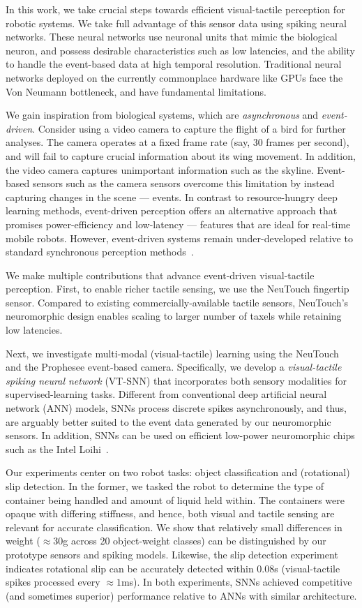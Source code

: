 \documentclass[fyp]{socreport}
\begin{document}
In this work, we take crucial steps towards efficient visual-tactile perception
for robotic systems. We take full advantage of this sensor data using spiking
neural networks. These neural networks use neuronal units that mimic the
biological neuron, and possess desirable characteristics such as low latencies,
and the ability to handle the event-based data at high temporal resolution.
Traditional neural networks deployed on the currently commonplace hardware like
GPUs face the Von Neumann bottleneck, and have fundamental limitations.

We gain inspiration from biological systems, which are \emph{asynchronous} and
\emph{event-driven}. Consider using a video camera to capture the flight of a
bird for further analyses. The camera operates at a fixed frame rate (say, 30
frames per second), and will fail to capture crucial information about its wing
movement. In addition, the video camera captures unimportant information such as
the skyline. Event-based sensors such as the camera sensors overcome this
limitation by instead capturing changes in the scene --- events. In contrast to
resource-hungry deep learning methods, event-driven perception offers an
alternative approach that promises power-efficiency and low-latency --- features
that are ideal for real-time mobile robots. However, event-driven systems remain
under-developed relative to standard synchronous perception
methods~\cite{pfeiffer2018deep}.

We make multiple contributions that advance event-driven visual-tactile
perception. First, to enable richer tactile sensing, we use the NeuTouch
fingertip sensor. Compared to existing commercially-available tactile sensors,
NeuTouch's neuromorphic design enables scaling to larger number of taxels while
retaining low latencies.

Next, we investigate multi-modal (visual-tactile) learning using the NeuTouch
and the Prophesee event-based camera. Specifically, we develop a
\emph{visual-tactile spiking neural network} (VT-SNN) that incorporates both
sensory modalities for supervised-learning tasks. Different from conventional
deep artificial neural network (ANN) models, SNNs process discrete spikes
asynchronously, and thus, are arguably better suited to the event data generated
by our neuromorphic sensors. In addition, SNNs can be used on efficient
low-power neuromorphic chips such as the Intel Loihi~\cite{davies2018loihi}.

Our experiments center on two robot tasks: object classification and
(rotational) slip detection. In the former, we tasked the robot to determine the
type of container being handled and amount of liquid held within. The containers
were opaque with differing stiffness, and hence, both visual and tactile sensing
are relevant for accurate classification. We show that relatively small
differences in weight ($\approx 30$g across 20 object-weight classes) can be
distinguished by our prototype sensors and spiking models. Likewise, the slip
detection experiment indicates rotational slip can be accurately detected within
$0.08$s (visual-tactile spikes processed every $\approx 1$ms). In both
experiments, SNNs achieved competitive (and sometimes superior) performance
relative to ANNs with similar architecture.
\end{document}
